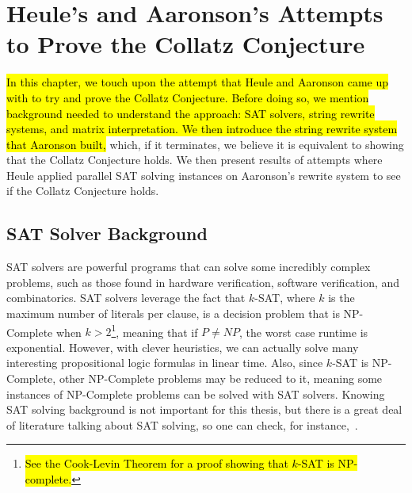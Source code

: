\chapter{Heule's and Aaronson's Attempts to Prove the Collatz Conjecture} \label{sec:SRSandSAT}
\hl{In this chapter, we touch upon the attempt that Heule and Aaronson came up with to try and prove the Collatz Conjecture. Before doing so, we mention background needed to understand the approach: SAT solvers, string rewrite systems, and matrix interpretation. We then introduce the string rewrite system that Aaronson built,} which, if it terminates, we believe it is equivalent to showing that the Collatz Conjecture holds. We then present results of attempts where Heule applied parallel SAT solving instances on Aaronson's rewrite system to see if the Collatz Conjecture holds.
\section{SAT Solver Background}
SAT solvers are powerful programs that can solve some incredibly complex problems, such as those found in hardware verification, software verification, and combinatorics. SAT solvers leverage the fact that $k$-SAT, where $k$ is the maximum number of literals per clause, is a decision problem that is NP-Complete when $k > 2$\footnote{\hl{See the Cook-Levin Theorem for a proof showing that $k$-SAT is NP-complete.}}, meaning that if $P \ne NP$, the worst case runtime is exponential. However, with clever heuristics, we can actually solve many interesting propositional logic formulas in linear time. Also, since $k$-SAT is NP-Complete, other NP-Complete problems may be reduced to it, meaning some instances of NP-Complete problems can be solved with SAT solvers. Knowing SAT solving background is not important for this thesis, but there is a great deal of literature talking about SAT solving, so one can check, for instance,~\cite{Biere:2009:HSV:1550723}.
